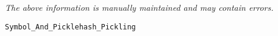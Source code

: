 \label{pkg:symbol\_and\_picklehash\_pickling}

{\tiny \it The above information is manually maintained and may contain errors.}
\begin{verbatim}
Symbol_And_Picklehash_Pickling
\end{verbatim}

